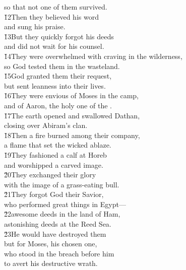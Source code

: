 \begin{poetry}
\poemll    so that not one of them survived. \\
\poeml \v{12}Then they believed his word \\
\poemll    and sung his praise. \\
\poeml \v{13}But they quickly forgot his deeds \\
\poemll    and did not wait for his counsel. \\
\poeml \v{14}They were overwhelmed with craving in the wilderness, \\
\poemll    so God tested them in the wasteland. \\
\poeml \v{15}God granted them their request, \\
\poemll    but sent leanness into their lives. \\
\poeml \v{16}They were envious of Moses in the camp, \\
\poemll    and of Aaron, the holy one of the . \\
\poeml \v{17}The earth opened and swallowed Dathan, \\
\poemll    closing over Abiram's clan. \\
\poeml \v{18}Then a fire burned among their company, \\
\poemll    a flame that set the wicked ablaze. \\
\poeml \v{19}They fashioned a calf at Horeb \\
\poemll    and worshipped a carved image. \\
\poeml \v{20}They exchanged their glory \\
\poemll    with the image of a grass-eating bull. \\
\poeml \v{21}They forgot God their Savior, \\
\poemll    who performed great things in Egypt--- \\
\poeml \v{22}awesome deeds in the land of Ham, \\
\poemll    astonishing deeds at the Reed Sea. \\
\poeml \v{23}He would have destroyed them \\
\poemll    but for Moses, his chosen one, \\
\poeml who stood in the breach before him \\
\poemll    to avert his destructive wrath. \\

\end{poetry}
